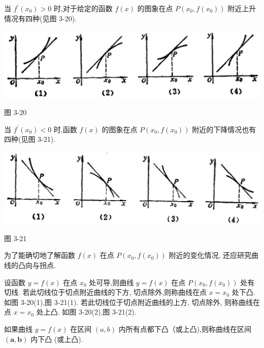 \documentclass[lang=cn,newtx,12pt,scheme=chinese]{elegantbook}
\begin{document}
当 \({f}^{\prime }\left( {x}_{0}\right) > 0\) 时,对于给定的函数 \(f\left( x\right)\) 的图象在点 \(P\left( {{x}_{0},f\left( {x}_{0}\right) }\right)\) 附近上升情况有四种(见图 3-20).

\begin{center}
\includegraphics[max width=1.0\textwidth]{images/01912c18-5c3f-733d-b775-749ba9897a9d_165_181993.jpg}
\end{center}

图 3-20

当 \({f}^{\prime }\left( {x}_{0}\right) < 0\) 时,函数 \(f\left( x\right)\) 的图象在点 \(P\left( {{x}_{0},f\left( {x}_{0}\right) }\right)\) 附近的下降情况也有四种(见图 3-21).

\begin{center}
\includegraphics[max width=1.0\textwidth]{images/01912c18-5c3f-733d-b775-749ba9897a9d_165_929562.jpg}
\end{center}

图 3-21

为了能确切地了解函数 \(f\left( x\right)\) 在点 \(P\left( {{x}_{0},f\left( {x}_{0}\right) }\right)\) 附近的变化情况, 还应研究曲线的凸向与拐点.

设函数 \(y = f\left( x\right)\) 在点 \({x}_{0}\) 处可导,则曲线 \(y = f\left( x\right)\) 在点 \(P\left( {{x}_{0},f\left( {x}_{0}\right) }\right)\) 处有切线. 若此切线位于切点附近曲线的下方, 切点除外,则称曲线在点 \(x = {x}_{0}\) 处下凸. 如图 3-20(1),图 3-21(1). 若此切线位于切点附近曲线的上方, 切点除外, 则称曲线在点 \(x = {x}_{0}\) 处上凸. 如图 3-20(2),图 3-21(2).

如果曲线 \(y = f\left( x\right)\) 在区间 \(\left( {a,b}\right)\) 内所有点都下凸（或上凸),则称曲线在区间 \(\left( {\mathbf{a},\mathbf{b}}\right)\) 内下凸 (或上凸).
\end{document}
